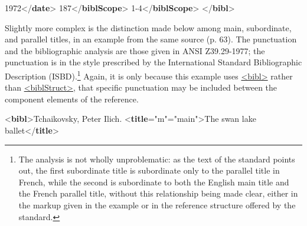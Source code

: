 \begin{shaded}
1972{</\textbf{date}>}\mbox{}\newline 
{}187{</\textbf{biblScope}>}\mbox{}\newline 
{}1-4{</\textbf{biblScope}>}\mbox{}\newline 
{</\textbf{bibl}>}\end{shaded}\egroup\par \noindent  \par
Slightly more complex is the distinction made below among main, subordinate, and parallel titles, in an example from the same source (p. 63). The punctuation and the bibliographic analysis are those given in ANSI Z39.29-1977; the punctuation is in the style prescribed by the International Standard Bibliographic Description (ISBD).\footnote{The analysis is not wholly unproblematic: as the text of the standard points out, the first subordinate title is subordinate only to the parallel title in French, while the second is subordinate to both the English main title and the French parallel title, without this relationship being made clear, either in the markup given in the example or in the reference structure offered by the standard.} Again, it is only because this example uses \hyperref[TEI.bibl]{<bibl>} rather than \hyperref[TEI.biblStruct]{<biblStruct>}, that specific punctuation may be included between the component elements of the reference. \par\bgroup{}\exampleFont \begin{shaded}\noindent\mbox{}{<\textbf{bibl}>}Tchaikovsky, Peter Ilich.\mbox{}\newline 
{<\textbf{title}\hspace*{1em}{level}="{m}"\hspace*{1em}{type}="{main}">}The swan lake ballet{</\textbf{title}>}\mbox{}\newline 

\end{shaded}

